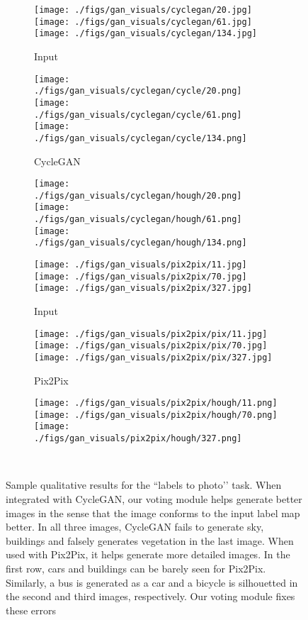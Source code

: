 \documentclass[runningheads]{llncs}
\begin{document}
\setlength\intextsep{8mm}
\begin{figure}
\captionsetup[subfigure]{labelformat=empty}
\centering
\hfill
\begin{subfigure}[b]{0.14\textwidth}
   \caption{Input}
   \texttt{[image: ./figs/gan\_visuals/cyclegan/20.jpg]}
   \texttt{[image: ./figs/gan\_visuals/cyclegan/61.jpg]}
   \texttt{[image: ./figs/gan\_visuals/cyclegan/134.jpg]}
\end{subfigure}
\begin{subfigure}[b]{0.14\textwidth}
   \caption{CycleGAN}
   \texttt{[image: ./figs/gan\_visuals/cyclegan/cycle/20.png]}
   \texttt{[image: ./figs/gan\_visuals/cyclegan/cycle/61.png]}
   \texttt{[image: ./figs/gan\_visuals/cyclegan/cycle/134.png]}
\end{subfigure}
\begin{subfigure}[b]{0.14\textwidth}
   \caption{}
   \texttt{[image: ./figs/gan\_visuals/cyclegan/hough/20.png]}
   \texttt{[image: ./figs/gan\_visuals/cyclegan/hough/61.png]}
   \texttt{[image: ./figs/gan\_visuals/cyclegan/hough/134.png]}
\end{subfigure}
\hfill
\begin{subfigure}[b]{0.14\textwidth}
    \caption{Input}
   \texttt{[image: ./figs/gan\_visuals/pix2pix/11.jpg]}
   \texttt{[image: ./figs/gan\_visuals/pix2pix/70.jpg]}
   \texttt{[image: ./figs/gan\_visuals/pix2pix/327.jpg]}
\end{subfigure}
\begin{subfigure}[b]{0.14\textwidth}
   \caption{Pix2Pix}
   \texttt{[image: ./figs/gan\_visuals/pix2pix/pix/11.jpg]}
   \texttt{[image: ./figs/gan\_visuals/pix2pix/pix/70.jpg]}
   \texttt{[image: ./figs/gan\_visuals/pix2pix/pix/327.jpg]}
\end{subfigure}
\begin{subfigure}[b]{0.14\textwidth}
   \caption{}
   \texttt{[image: ./figs/gan\_visuals/pix2pix/hough/11.png]}
   \texttt{[image: ./figs/gan\_visuals/pix2pix/hough/70.png]}
   \texttt{[image: ./figs/gan\_visuals/pix2pix/hough/327.png]}
\end{subfigure}
~~~~
\caption{Sample qualitative results for the ``labels to photo’' task. When integrated with  CycleGAN, our voting module helps generate better images in the sense that the image conforms to the input label map better. In all three images, CycleGAN fails to generate sky, buildings and falsely generates vegetation in the last image. When used with Pix2Pix, it helps generate more detailed images. In the first row, cars and buildings can be barely seen for Pix2Pix. Similarly, a bus is generated as a car and a bicycle is silhouetted in the second and third images, respectively. Our voting module fixes these errors}
\label{fig:vis-results-gan}
\end{figure}
\end{document}
